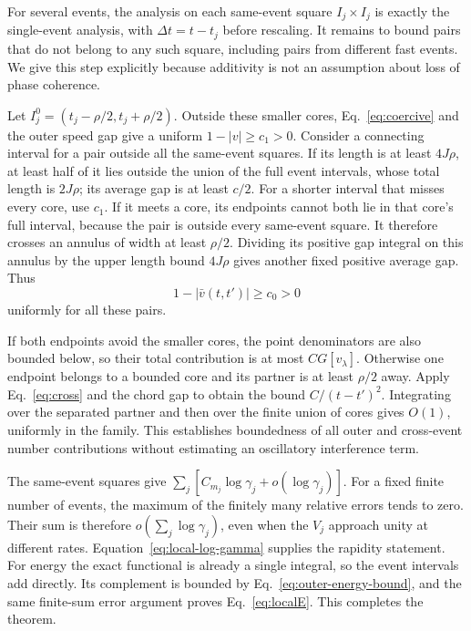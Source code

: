 \documentclass[11pt]{article}
\begin{document}
For several events, the analysis on each same-event square
$I_j\times I_j$ is exactly the single-event analysis, with
$\Delta t=t-t_j$ before rescaling. It remains to bound pairs that
do not belong to any such square, including pairs from different
fast events. We give this step explicitly because additivity is
not an assumption about loss of phase coherence.

Let $I_j^0=(t_j-\rho/2,t_j+\rho/2)$.
Outside these smaller cores, Eq.~\eqref{eq:coercive} and the outer
speed gap give a uniform $1-|v|\ge c_1>0$.
Consider a connecting interval for a pair outside all the
same-event squares. If its length is at least $4J\rho$, at least
half of it lies outside the union of the full event intervals,
whose total length is $2J\rho$; its average gap is at least $c/2$.
For a shorter interval that misses every core, use $c_1$.
If it meets a core, its endpoints cannot both lie in that core's
full interval, because the pair is outside every same-event
square. It therefore crosses an annulus of width at least
$\rho/2$. Dividing its positive gap integral on this annulus by
the upper length bound $4J\rho$ gives another fixed positive
average gap. Thus
\begin{equation}
 1-|\bar v(t,t')|\ge c_0>0
 \label{eq:outer-chord-gap}
\end{equation}
uniformly for all these pairs.

If both endpoints avoid the smaller cores, the point denominators
are also bounded below, so their total contribution is at most
$C G[v_\lambda]$. Otherwise one endpoint belongs to a bounded
core and its partner is at least $\rho/2$ away. Apply
Eq.~\eqref{eq:cross} and the chord gap to obtain the bound
$C/(t-t')^2$. Integrating over the separated partner and then over
the finite union of cores gives $O(1)$, uniformly in the family.
This establishes boundedness of all outer and cross-event number
contributions without estimating an oscillatory interference term.

The same-event squares give
$\sum_j[C_{m_j}\log\gamma_j+o(\log\gamma_j)]$.
For a fixed finite number of events, the maximum of the finitely
many relative errors tends to zero. Their sum is therefore
$o(\sum_j\log\gamma_j)$, even when the $V_j$ approach unity at
different rates. Equation~\eqref{eq:local-log-gamma} supplies the
rapidity statement. For energy the exact functional is already a
single integral, so the event intervals add directly.
Its complement is bounded by Eq.~\eqref{eq:outer-energy-bound},
and the same finite-sum error argument proves
Eq.~\eqref{eq:localE}. This completes the theorem.
\end{document}
